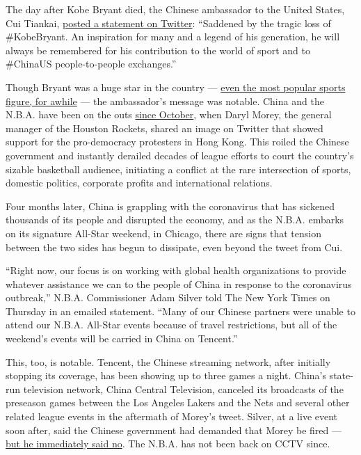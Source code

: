 The day after Kobe Bryant died, the Chinese ambassador to the United
States, Cui Tiankai,
\href{https://twitter.com/AmbCuiTiankai/status/1221869773828567040?s=20}{posted
a statement on Twitter}: ``Saddened by the tragic loss of \#KobeBryant.
An inspiration for many and a legend of his generation, he will always
be remembered for his contribution to the world of sport and to
\#ChinaUS people-to-people exchanges.''

Though Bryant was a huge star in the country ---
\href{https://www.nytimes.com/2020/01/28/sports/basketball/kobe-NBA-global.html}{even
the most popular sports figure, for awhile} --- the ambassador's message
was notable. China and the N.B.A. have been on the outs
\href{https://www.nytimes.com/2019/10/06/sports/daryl-morey-rockets-china.html}{since
October}, when Daryl Morey, the general manager of the Houston Rockets,
shared an image on Twitter that showed support for the pro-democracy
protesters in Hong Kong. This roiled the Chinese government and
instantly derailed decades of league efforts to court the country's
sizable basketball audience, initiating a conflict at the rare
intersection of sports, domestic politics, corporate profits and
international relations.

Four months later, China is grappling with the coronavirus that has
sickened thousands of its people and disrupted the economy, and as the
N.B.A. embarks on its signature All-Star weekend, in Chicago, there are
signs that tension between the two sides has begun to dissipate, even
beyond the tweet from Cui.

``Right now, our focus is on working with global health organizations to
provide whatever assistance we can to the people of China in response to
the coronavirus outbreak,'' N.B.A. Commissioner Adam Silver told The New
York Times on Thursday in an emailed statement. ``Many of our Chinese
partners were unable to attend our N.B.A. All-Star events because of
travel restrictions, but all of the weekend's events will be carried in
China on Tencent.''

This, too, is notable. Tencent, the Chinese streaming network, after
initially stopping its coverage, has been showing up to three games a
night. China's state-run television network, China Central Television,
canceled its broadcasts of the preseason games between the Los Angeles
Lakers and the Nets and several other related league events in the
aftermath of Morey's tweet. Silver, at a live event soon after, said the
Chinese government had demanded that Morey be fired ---
\href{https://www.nytimes.com/2019/10/17/sports/basketball/nba-china-adam-silver.html}{but
he immediately said no}. The N.B.A. has not been back on CCTV since.

